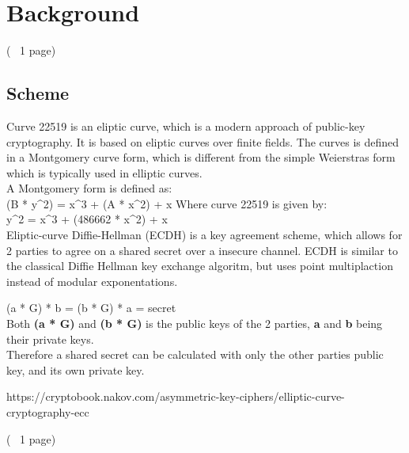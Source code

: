 \section{Background}

(~ 1 page)
\subsection{Scheme}
Curve 22519 is an eliptic curve, which is a modern approach of public-key cryptography. It is based on eliptic curves over finite fields.
The curves is defined in a Montgomery curve form, which is different from the simple Weierstras form which is typically used in elliptic curves.\\
A Montgomery form is defined as:\\
(B * y^2) = x^3 + (A * x^2) + x
Where curve 22519 is given by:\\
y^2 = x^3 + (486662 * x^2) + x\\

Eliptic-curve Diffie-Hellman (ECDH) is a key agreement scheme, which allows for 2 parties to agree on a shared secret over a insecure channel.
ECDH is similar to the classical Diffie Hellman key exchange algoritm, but uses point multiplaction instead of modular exponentations.

(a * G) * b = (b * G) * a = secret\\

Both \textbf{(a * G)} and \textbf{(b * G)} is the public keys of the 2 parties, \textbf{a} and \textbf{b} being their private keys.\\
Therefore a shared secret can be calculated with only the other parties public key, and its own private key.



https://cryptobook.nakov.com/asymmetric-key-ciphers/elliptic-curve-cryptography-ecc


(~ 1 page)
